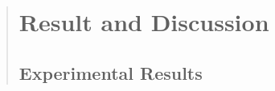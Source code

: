 \documentclass[runningheads]{llncs}
\begin{document}
\begin{abstract}


\section{Result and Discussion}

\subsection{Experimental Results}





\end{abstract}
\end{document}
